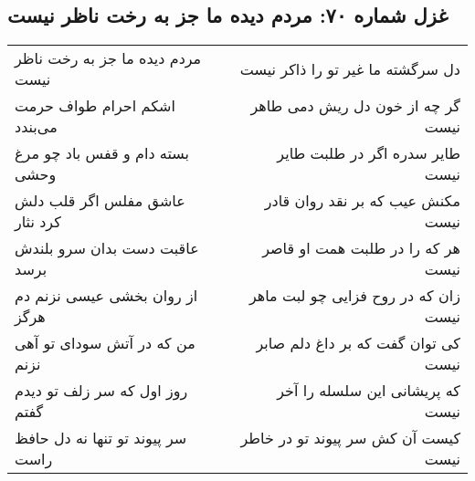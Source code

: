 \begin{center}
\section*{غزل شماره ۷۰: مردم دیده ما جز به رخت ناظر نیست}
\label{sec:sh070}
\begin{longtable}{l p{0.5cm} r}
مردم دیده ما جز به رخت ناظر نیست
&&
دل سرگشته ما غیر تو را ذاکر نیست
\\
اشکم احرام طواف حرمت می‌بندد
&&
گر چه از خون دل ریش دمی طاهر نیست
\\
بسته دام و قفس باد چو مرغ وحشی
&&
طایر سدره اگر در طلبت طایر نیست
\\
عاشق مفلس اگر قلب دلش کرد نثار
&&
مکنش عیب که بر نقد روان قادر نیست
\\
عاقبت دست بدان سرو بلندش برسد
&&
هر که را در طلبت همت او قاصر نیست
\\
از روان بخشی عیسی نزنم دم هرگز
&&
زان که در روح فزایی چو لبت ماهر نیست
\\
من که در آتش سودای تو آهی نزنم
&&
کی توان گفت که بر داغ دلم صابر نیست
\\
روز اول که سر زلف تو دیدم گفتم
&&
که پریشانی این سلسله را آخر نیست
\\
سر پیوند تو تنها نه دل حافظ راست
&&
کیست آن کش سر پیوند تو در خاطر نیست
\\
\end{longtable}
\end{center}
